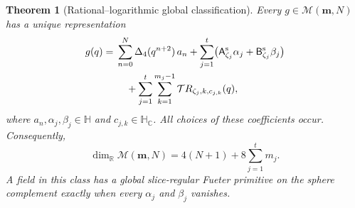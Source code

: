 \documentclass[11pt,a4paper]{article}
\numberwithin{equation}{section}
\newtheorem{theorem}{Theorem}[section]
\theoremstyle{definition}
\theoremstyle{remark}
\newcommand{\R}{\mathbb R}
\newcommand{\C}{\mathbb C}
\newcommand{\HH}{\mathbb H}
\newcommand{\HC}{\mathbb H_{\C}}
\newcommand{\T}{\mathcal T}
\newcommand{\Lap}{\Delta_4}
\newcommand{\Asym}{\mathsf A^{\mathrm s}}
\newcommand{\Bsym}{\mathsf B^{\mathrm s}}
\begin{document}
\begin{theorem}[Rational--logarithmic global classification]
\label{thm:global-normal}
Every $g\in\mathcal M(\boldsymbol m,N)$ has a unique representation
\begin{align}
 g(q)={}&\sum_{n=0}^{N}\Lap(q^{n+2})\,a_n
   +\sum_{j=1}^{t}\bigl(\Asym_{\zeta_j}\alpha_j
                          +\Bsym_{\zeta_j}\beta_j\bigr)\notag\\
 &\quad+\sum_{j=1}^{t}\sum_{k=1}^{m_j-1}
                   \T R_{\zeta_j,k,c_{j,k}}(q),
 \label{eq:global-normal}
\end{align}
where $a_n,\alpha_j,\beta_j\in\HH$ and $c_{j,k}\in\HC$.
All choices of these coefficients occur. Consequently,
\begin{equation}
 \boxed{\dim_{\R}\mathcal M(\boldsymbol m,N)
       =4(N+1)+8\sum_{j=1}^{t}m_j.}
 \label{eq:global-dimension}
\end{equation}
A field in this class has a global slice-regular Fueter primitive on
the sphere complement exactly when every $\alpha_j$ and $\beta_j$
vanishes.
\end{theorem}
\end{document}
